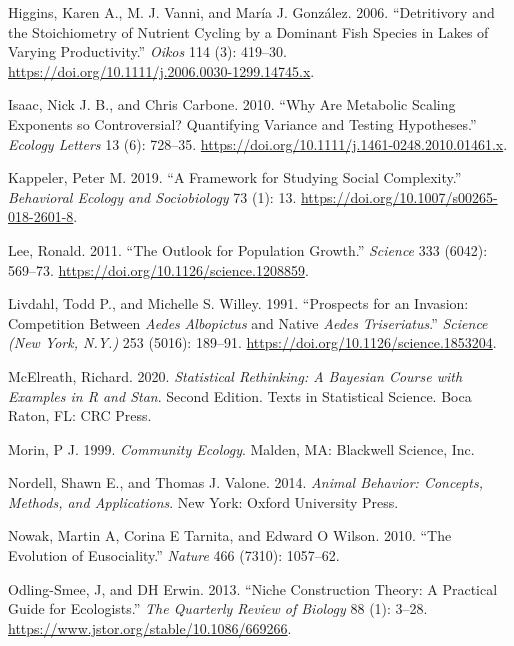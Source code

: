 \documentclass[
  letterpaper,
  DIV=11,
  numbers=noendperiod]{scrreprt}
\newlength{\cslhangindent}
\newenvironment{CSLReferences}[2] %
 {\begin{list}{}{%
  \setlength{\itemindent}{0pt}
  \setlength{\leftmargin}{0pt}
  \setlength{\parsep}{0pt}
  \ifodd #1
   \setlength{\leftmargin}{\cslhangindent}
   \setlength{\itemindent}{-1\cslhangindent}
  \fi
  \setlength{\itemsep}{#2\baselineskip}}}
 {\end{list}}
\begin{document}
\begin{CSLReferences}{1}{0}
Higgins, Karen A., M. J. Vanni, and María J. González. 2006.
{``Detritivory and the Stoichiometry of Nutrient Cycling by a Dominant
Fish Species in Lakes of Varying Productivity.''} \emph{Oikos} 114 (3):
419--30. \url{https://doi.org/10.1111/j.2006.0030-1299.14745.x}.

Isaac, Nick J. B., and Chris Carbone. 2010. {``Why Are Metabolic Scaling
Exponents so Controversial? {Quantifying} Variance and Testing
Hypotheses.''} \emph{Ecology Letters} 13 (6): 728--35.
\url{https://doi.org/10.1111/j.1461-0248.2010.01461.x}.

Kappeler, Peter M. 2019. {``A Framework for Studying Social
Complexity.''} \emph{Behavioral Ecology and Sociobiology} 73 (1): 13.
\url{https://doi.org/10.1007/s00265-018-2601-8}.

Lee, Ronald. 2011. {``The {Outlook} for {Population Growth}.''}
\emph{Science} 333 (6042): 569--73.
\url{https://doi.org/10.1126/science.1208859}.

Livdahl, Todd P., and Michelle S. Willey. 1991. {``Prospects for an
{Invasion}: {Competition Between} {\emph{Aedes}}{ \emph{}
}{\emph{Albopictus}} and {Native} {\emph{Aedes}}{ \emph{}
}{\emph{Triseriatus}}.''} \emph{Science (New York, N.Y.)} 253 (5016):
189--91. \url{https://doi.org/10.1126/science.1853204}.

McElreath, Richard. 2020. \emph{Statistical {Rethinking}: {A Bayesian
Course} with {Examples} in {R} and {Stan}}. Second Edition. Texts in
{Statistical Science}. {Boca Raton, FL}: {CRC Press}.

Morin, P J. 1999. \emph{Community {Ecology}}. {Malden, MA}: {Blackwell
Science, Inc.}

Nordell, Shawn E., and Thomas J. Valone. 2014. \emph{Animal {Behavior}:
{Concepts}, {Methods}, and {Applications}}. {New York}: {Oxford
University Press}.

Nowak, Martin A, Corina E Tarnita, and Edward O Wilson. 2010. {``The
Evolution of Eusociality.''} \emph{Nature} 466 (7310): 1057--62.

Odling-Smee, J, and DH Erwin. 2013. {``Niche Construction Theory: {A}
Practical Guide for Ecologists.''} \emph{The Quarterly Review of
Biology} 88 (1): 3--28.
\url{https://www.jstor.org/stable/10.1086/669266}.


\end{CSLReferences}
\end{document}
